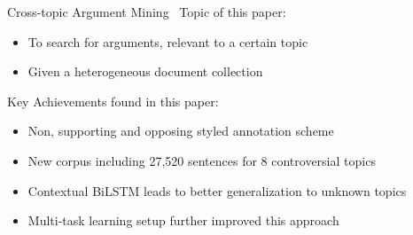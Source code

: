 \documentclass[english,handout]{mlutalk}
\begin{document}
\begin{frame}{Cross-topic Argument Mining~\cite{StabMSRG2018}}
  Topic of this paper:
  \begin{itemize}
    \item To search for arguments, relevant to a certain topic 
    \item Given a heterogeneous document collection
  \end{itemize}
  Key Achievements found in this paper:
  \begin{itemize}
    \item Non, supporting and opposing styled annotation scheme
    \item New corpus including 27,520 sentences for 8 controversial topics
    \item Contextual BiLSTM leads to better generalization to unknown topics
    \item Multi-task learning setup further improved this approach 
  \end{itemize}
\end{frame}
\end{document}
